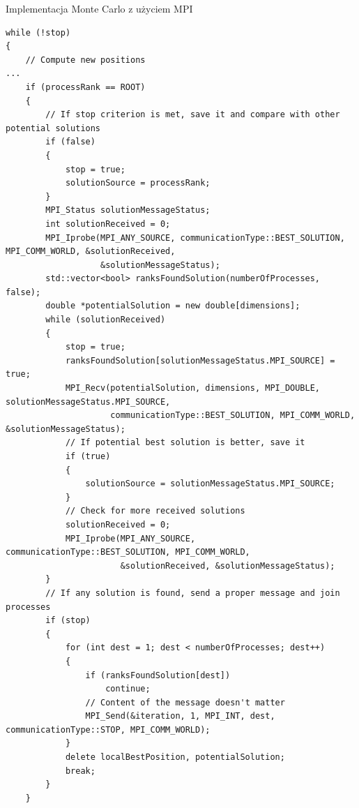 \documentclass[handout]{beamer}
\begin{document}
\begin{frame}[fragile]{Implementacja Monte Carlo z użyciem MPI}

\vspace{-.8cm}

\begin{lstlisting}[style=mycpp, label=code:pso_before, caption={MPI -- Monte Carlo.}]
while (!stop)
{
    // Compute new positions 
...
    if (processRank == ROOT)
    {
        // If stop criterion is met, save it and compare with other potential solutions
        if (false)
        {
            stop = true;
            solutionSource = processRank;
        }
        MPI_Status solutionMessageStatus;
        int solutionReceived = 0;
        MPI_Iprobe(MPI_ANY_SOURCE, communicationType::BEST_SOLUTION, MPI_COMM_WORLD, &solutionReceived,
                   &solutionMessageStatus);
        std::vector<bool> ranksFoundSolution(numberOfProcesses, false);
        double *potentialSolution = new double[dimensions];
        while (solutionReceived)
        {
            stop = true;
            ranksFoundSolution[solutionMessageStatus.MPI_SOURCE] = true;
            MPI_Recv(potentialSolution, dimensions, MPI_DOUBLE, solutionMessageStatus.MPI_SOURCE,
                     communicationType::BEST_SOLUTION, MPI_COMM_WORLD, &solutionMessageStatus);
            // If potential best solution is better, save it
            if (true)
            {
                solutionSource = solutionMessageStatus.MPI_SOURCE;
            }
            // Check for more received solutions
            solutionReceived = 0;
            MPI_Iprobe(MPI_ANY_SOURCE, communicationType::BEST_SOLUTION, MPI_COMM_WORLD,
                       &solutionReceived, &solutionMessageStatus);
        }
        // If any solution is found, send a proper message and join processes
        if (stop)
        {
            for (int dest = 1; dest < numberOfProcesses; dest++)
            {
                if (ranksFoundSolution[dest])
                    continue;
                // Content of the message doesn't matter
                MPI_Send(&iteration, 1, MPI_INT, dest, communicationType::STOP, MPI_COMM_WORLD);
            }
            delete localBestPosition, potentialSolution;
            break;
        }
    }
    \end{lstlisting}
\end{frame}
\end{document}
